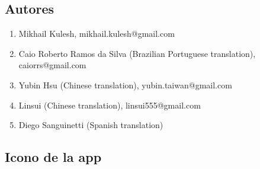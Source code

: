 \documentclass[DIV=calc, paper=a4, fontsize=11pt, twocolumn]{scrartcl}
\begin{document}
\subsection{Autores}

\begin{enumerate}
\item Mikhail Kulesh,
mikhail.kulesh@gmail.com

\item Caio Roberto Ramos da Silva
(Brazilian Portuguese translation),
caiorrs@gmail.com

\item Yubin Hsu
(Chinese translation),
yubin.taiwan@gmail.com

\item Linsui
(Chinese translation),
linsui555@gmail.com

\item Diego Sanguinetti
(Spanish translation)
\end{enumerate}

\subsection{Icono de la app}
\end{document}
